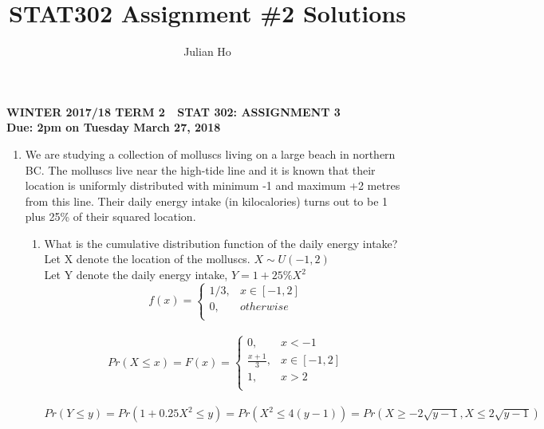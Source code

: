 \documentclass[11pt]{article}
\title{STAT302 Assignment \#2 Solutions}
\author{Julian Ho}
\begin{document}
\begin{center}
\textbf{WINTER 2017/18 TERM 2  \,\, STAT 302: ASSIGNMENT 3 \\
Due: 2pm on Tuesday March 27, 2018}
\end{center}

\begin{enumerate}[label=\textbf{Question \arabic*:},start=1]

\item
We are studying a collection of molluscs living on a large beach in northern BC. The molluscs live near the high-tide line and it is known that their location is uniformly distributed with minimum -1 and maximum +2 metres from this line. Their daily energy intake (in kilocalories) turns out to be 1 plus 25\% of their squared location.
\begin{enumerate}
	\item What is the cumulative distribution function of the daily energy intake?\\

	Let X denote the location of the molluscs. $X \sim U(-1, 2)$ \\
	Let Y denote the daily energy intake, $Y = 1 + 25\% X^2$\\
	$$f(x) = \begin{cases}
		1/3, & x \in [-1, 2]\\
		0, & otherwise\\
		\end{cases}$$\\
	$$Pr(X \leq x) = F(x) = \begin{cases}
		0, & x < -1 \\
		\frac{x + 1}{3}, & x \in [-1, 2]\\
		1, & x > 2\\
		\end{cases}$$\\

	$Pr(Y \leq y) = Pr(1 + 0.25 X^2 \leq y) = Pr(X^2 \leq 4(y-1)) = Pr(X \geq -2\sqrt{y-1}, X \leq 2\sqrt{y-1})$ \\
	

\end{enumerate}
\end{enumerate}
\end{document}
